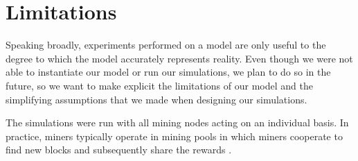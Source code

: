 \section{Limitations}
Speaking broadly, experiments performed on a model are only useful to the degree to which the model accurately represents reality. Even though we were not able to instantiate our model or run our simulations, we plan to do so in the future, so we want to make explicit the limitations of our model and the simplifying assumptions that we made when designing our simulations. 

The simulations were run with all mining nodes acting on an individual basis. In practice, miners typically operate in mining pools in which miners cooperate to find new blocks and subsequently share the rewards \cite{Rosenfeld}.